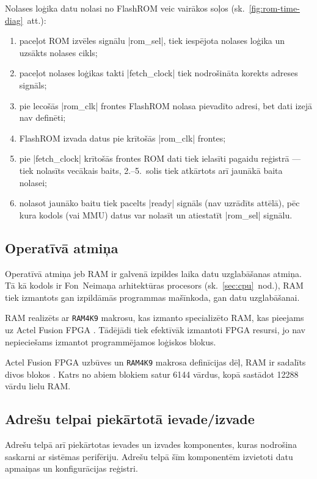 	\pagebreak[2]
	Nolases loģika datu nolasi no FlashROM veic vairākos soļos (sk.~\ref{fig:rom-time-diag}~att.):
	\begin{enumerate}
		\item paceļot ROM izvēles signālu |rom_sel|, tiek iespējota nolases
			loģika un uzsākts nolases cikls;
		\item paceļot nolases loģikas takti |fetch_clock| 
			tiek nodrošināta korekts adreses signāls;
		\item pie lecošās |rom_clk| frontes FlashROM nolasa pievadīto adresi,
			bet dati izejā nav definēti;
		\item FlashROM izvada datus pie krītošās |rom_clk|	frontes;
		\item pie |fetch_clock| krītošās frontes ROM dati tiek ielasīti
			pagaidu reģistrā --- tiek nolasīts vecākais baits, 
			2.--5.~solis tiek atkārtots arī jaunākā baita nolasei;
		\item nolasot jaunāko baitu tiek pacelts |ready| signāls
			(nav uzrādīts attēlā), pēc kura kodols (vai MMU) datus var
			nolasīt un atiestatīt |rom_sel| signālu.
	\end{enumerate}
	
	

\subsection{Operatīvā atmiņa} \label{sec:ram}
	Operatīvā atmiņa jeb RAM ir galvenā izpildes laika datu uzglabāšanas
	atmiņa. Tā kā kodols ir Fon~Neimaņa arhitektūras procesors
	(sk.~\ref{sec:cpu}~nod.), RAM tiek izmantots gan izpildāmās
	programmas mašīnkoda, gan datu uzglabāšanai.
	
	RAM realizēts ar \texttt{RAM4K9} makrosu, kas izmanto specializēto
	RAM, kas pieejams uz Actel Fusion FPGA \cite{RAM4K9}.
	Tādējādi tiek
	efektīvāk izmantoti FPGA resursi, jo nav nepieciešams izmantot
	programmējamos loģiskos blokus.
	
	Actel Fusion FPGA uzbūves un \texttt{RAM4K9} makrosa
	definīcijas dēļ, RAM ir sadalīts divos blokos \cite{RAM4K9}. 
	Katrs no abiem blokiem satur 6144 vārdus,
	kopā sastādot 12288 vārdu lielu RAM.
	
	

\clearpage
\subsection{Adrešu telpai piekārtotā ievade/izvade}
	Adrešu telpā arī piekārtotas ievades un izvades komponentes,
	kuras nodrošina saskarni ar sistēmas perifēriju. Adrešu telpā šīm
	komponentēm izvietoti datu apmaiņas un konfigurācijas reģistri.
	
